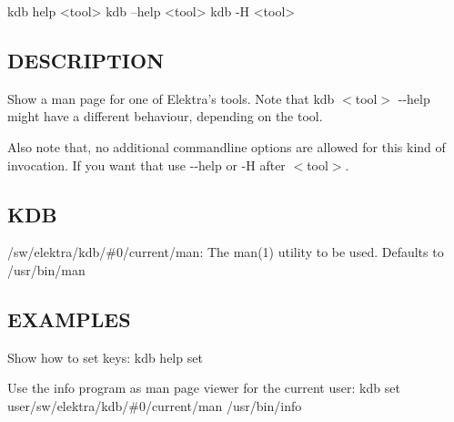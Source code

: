 \begin{DoxyVerb}    kdb help <tool>
    kdb --help <tool>
    kdb -H <tool>
\end{DoxyVerb}


\subsection*{D\+E\+S\+C\+R\+I\+P\+T\+I\+O\+N}

Show a man page for one of Elektra's tools. Note that {\ttfamily kdb $<$tool$>$ -\/-\/help} might have a different behaviour, depending on the tool.

Also note that, no additional commandline options are allowed for this kind of invocation. If you want that use {\ttfamily -\/-\/help} or {\ttfamily -\/\+H} after {\ttfamily $<$tool$>$}.

\subsection*{K\+D\+B}


\begin{DoxyItemize}
\item {\ttfamily /sw/elektra/kdb/\#0/current/man}\+: The man(1) utility to be used. Defaults to /usr/bin/man
\end{DoxyItemize}

\subsection*{E\+X\+A\+M\+P\+L\+E\+S}

Show how to set keys\+: {\ttfamily kdb help set}

Use the info program as man page viewer for the current user\+: {\ttfamily kdb set user/sw/elektra/kdb/\#0/current/man /usr/bin/info} 